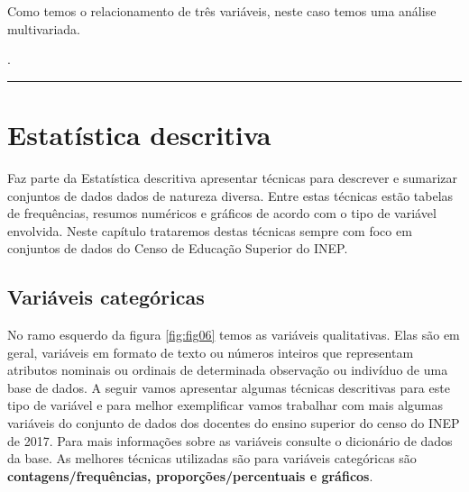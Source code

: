 \documentclass[12pt,]{style/krantz}
\makeatletter
\newenvironment{Shaded}{\begin{snugshade}}{\end{snugshade}}
\newcommand{\NormalTok}[1]{#1}
\newenvironment{kframe}{%
\medskip{}
\setlength{\fboxsep}{.8em}
 \def\at@end@of@kframe{}%
 \ifinner\ifhmode%
  \def\at@end@of@kframe{\end{minipage}}%
  \begin{minipage}{\columnwidth}%
 \fi\fi%
 \def\FrameCommand##1{\hskip\@totalleftmargin \hskip-\fboxsep
 \colorbox{shadecolor}{##1}\hskip-\fboxsep
     \hskip-\linewidth \hskip-\@totalleftmargin \hskip\columnwidth}%
 \MakeFramed {\advance\hsize-\width
   \@totalleftmargin\z@ \linewidth\hsize
   \@setminipage}}%
 {\par\unskip\endMakeFramed%
 \at@end@of@kframe}
\renewenvironment{Shaded}{\begin{kframe}}{\end{kframe}}
\theoremstyle{definition}
\theoremstyle{definition}
\theoremstyle{definition}
\theoremstyle{remark}
\let\BeginKnitrBlock\begin \let\EndKnitrBlock\end
\makeatother
\begin{document}
\BeginKnitrBlock{solution}
\iffalse{} {Solução. } \fi{}Como temos o relacionamento de três variáveis, neste caso temos uma análise multivariada.
\EndKnitrBlock{solution}

\begin{Shaded}
\begin{Highlighting}[]
\NormalTok{.}
\end{Highlighting}
\end{Shaded}

\begin{center}\rule{0.5\linewidth}{\linethickness}\end{center}

\pagebreak

\hypertarget{estatistica-descritiva}{%
\chapter{Estatística descritiva}\label{estatistica-descritiva}}

Faz parte da Estatística descritiva apresentar técnicas para descrever e sumarizar conjuntos de dados dados de natureza diversa. Entre estas técnicas estão tabelas de frequências, resumos numéricos e gráficos de acordo com o tipo de variável envolvida. Neste capítulo trataremos destas técnicas sempre com foco em conjuntos de dados do Censo de Educação Superior do INEP.

\hypertarget{variaveis-categoricas}{%
\section{Variáveis categóricas}\label{variaveis-categoricas}}

No ramo esquerdo da figura \ref{fig:fig06} temos as variáveis qualitativas. Elas são em geral, variáveis em formato de texto ou números inteiros que representam atributos nominais ou ordinais de determinada observação ou indivíduo de uma base de dados. A seguir vamos apresentar algumas técnicas descritivas para este tipo de variável e para melhor exemplificar vamos trabalhar com mais algumas variáveis do conjunto de dados dos docentes do ensino superior do censo do INEP de 2017. Para mais informações sobre as variáveis consulte o dicionário de dados da base. As melhores técnicas utilizadas são para variáveis categóricas são \textbf{contagens/frequências, proporções/percentuais e gráficos}.
\end{document}
